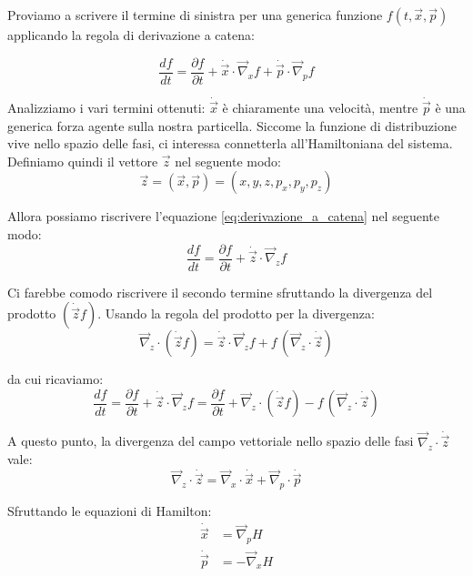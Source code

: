 \documentclass[11pt, a4paper, oneside]{scrreprt}
\begin{document}
Proviamo a scrivere il termine di sinistra per una generica funzione $f(t, \vec{x}, \vec{p})$ applicando
la regola di derivazione a catena:

\begin{equation} \label{eq:derivazione_a_catena}
    \frac{df}{dt} = \frac{\partial f}{\partial t} + \dot{\vec{x}} \cdot \vec{\nabla}_{x}f + \dot{\vec{p}} \cdot \vec{\nabla}_{p}f
\end{equation}

Analizziamo i vari termini ottenuti: $\dot{\vec{x}}$ è chiaramente una velocità, mentre $\dot{\vec{p}}$ è una generica forza agente sulla nostra particella.
Siccome la funzione di distribuzione vive nello spazio delle fasi, ci interessa connetterla all'Hamiltoniana del sistema.
Definiamo quindi il vettore $\vec{z}$ nel seguente modo:
\begin{equation}
    \vec{z} = (\vec{x}, \vec{p}) = (x, y, z, p_x, p_y, p_z)
\end{equation}

Allora possiamo riscrivere l'equazione \eqref{eq:derivazione_a_catena} nel seguente modo:
\begin{equation}
    \frac{df}{dt} = \frac{\partial f}{\partial t} + \dot{\vec{z}} \cdot \vec{\nabla}_{z}f
\end{equation}

Ci farebbe comodo riscrivere il secondo termine sfruttando la divergenza del prodotto $(\dot{\vec{z}} f)$.
Usando la regola del prodotto per la divergenza:
\begin{equation}
    \vec{\nabla}_{z} \cdot (\dot{\vec{z}} f) = \dot{\vec{z}} \cdot \vec{\nabla}_{z}f + f \, (\vec{\nabla}_{z} \cdot \dot{\vec{z}})
\end{equation}

da cui ricaviamo:
\begin{equation}
    \frac{df}{dt} = \frac{\partial f}{\partial t} + \dot{\vec{z}} \cdot \vec{\nabla}_{z}f = \frac{\partial f}{\partial t} + \vec{\nabla}_{z} \cdot (\dot{\vec{z}}f) - f \, (\vec{\nabla}_{z} \cdot \dot{\vec{z}})
\end{equation}

A questo punto, la divergenza del campo vettoriale nello spazio delle fasi $\vec{\nabla}_{z} \cdot \dot{\vec{z}}$ vale:
\begin{equation}
    \vec{\nabla}_{z} \cdot \dot{\vec{z}} = \vec{\nabla}_{x} \cdot \dot{\vec{x}} + \vec{\nabla}_{p} \cdot \dot{\vec{p}}
\end{equation}

Sfruttando le equazioni di Hamilton:
\begin{align} \label{eq:proprieta_hamiltoniana}
    \dot{\vec{x}} &= \vec{\nabla}_{p}H \\
    \dot{\vec{p}} &= -\vec{\nabla}_{x}H \nonumber
\end{align}
\end{document}
